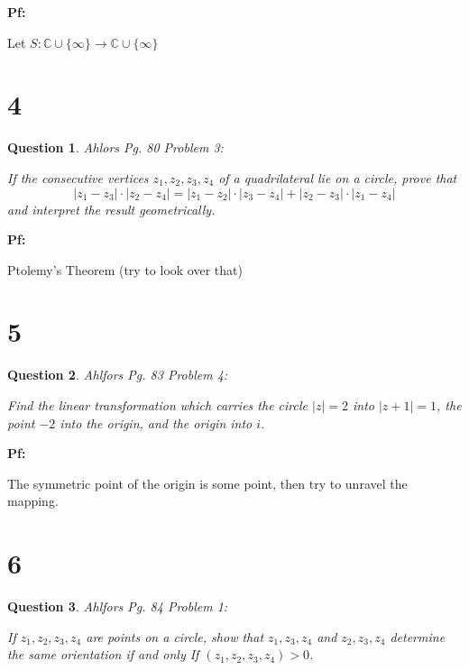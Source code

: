 \documentclass{article}
\newtheorem{question}{Question}
\begin{document}
\textbf{Pf:}

Let $S:\mathbb{C}\cup\{\infty\}\rightarrow \mathbb{C}\cup\{\infty\}$

\break

\section*{4}
\begin{myBox}[]{}
    \begin{question}
        Ahlors Pg. 80 Problem 3:

        If the consecutive vertices $z_1,z_2,z_3,z_4$ of a quadrilateral lie on a circle, prove that
        $$|z_1-z_3|\cdot|z_2-z_4|=|z_1-z_2|\cdot|z_3-z_4|+|z_2-z_3|\cdot|z_1-z_4|$$
        and interpret the result geometrically.
    \end{question}
\end{myBox}

\textbf{Pf:}

Ptolemy's Theorem (try to look over that)

\break

\section*{5}
\begin{myBox}[]{}
    \begin{question}
        Ahlfors Pg. 83 Problem 4:

        Find the linear transformation which carries the circle $|z|=2$ into $|z+1|=1$,
        the point $-2$ into the origin, and the origin into $i$.
    \end{question}
\end{myBox}

\textbf{Pf:}

The symmetric point of the origin is some point, then try to unravel the mapping.

\break

\section*{6}
\begin{myBox}[]{}
    \begin{question}
        Ahlfors Pg. 84 Problem 1:

        If $z_1,z_2,z_3,z_4$ are points on a circle, show that $z_1,z_3,z_4$ and $z_2,z_3,z_4$ determine the same orientation if and only If
        $(z_1,z_2,z_3,z_4)>0$.
    \end{question}
\end{myBox}
\end{document}
